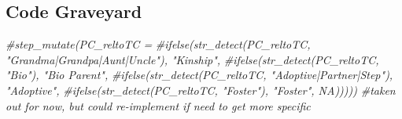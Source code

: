 \documentclass[
]{article}
\newenvironment{Shaded}{\begin{snugshade}}{\end{snugshade}}
\newcommand{\CommentTok}[1]{\textcolor[rgb]{0.56,0.35,0.01}{\textit{#1}}}
\begin{document}
\hypertarget{code-graveyard}{%
\subsection{Code Graveyard}\label{code-graveyard}}

\begin{Shaded}
\begin{Highlighting}[]
                    \CommentTok{\#step\_mutate(PC\_reltoTC = }
                                  \CommentTok{\#ifelse(str\_detect(PC\_reltoTC, "Grandma|Grandpa|Aunt|Uncle"), "Kinship", }
                                         \CommentTok{\#ifelse(str\_detect(PC\_reltoTC, "Bio"), "Bio Parent", }
                                         \CommentTok{\#ifelse(str\_detect(PC\_reltoTC, "Adoptive|Partner|Step"), "Adoptive", }
                                         \CommentTok{\#ifelse(str\_detect(PC\_reltoTC, "Foster"), "Foster", NA)))))}
                    \CommentTok{\#taken out for now, but could re{-}implement if need to get more specific}
\end{Highlighting}
\end{Shaded}
\end{document}
